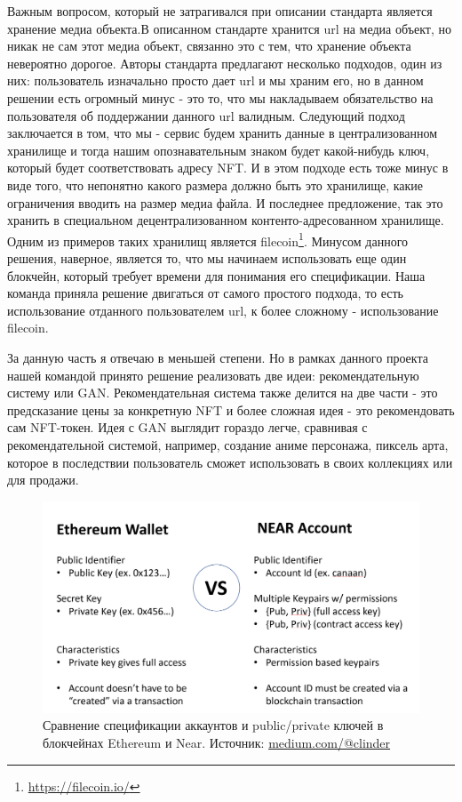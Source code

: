 		Важным вопросом, который не затрагивался при описании стандарта является хранение медиа объекта.В описанном стандарте хранится url на медиа объект, но никак не сам этот медиа объект, связанно это с тем, что хранение объекта невероятно дорогое. Авторы стандарта предлагают несколько подходов, один из них: пользователь изначально просто дает url и мы храним его, но в данном решении есть огромный минус - это то, что мы накладываем обязательство на пользователя об поддержании данного url валидным. Следующий подход заключается в том, что мы - сервис будем хранить данные в централизованном хранилище и тогда нашим опознавательным знаком будет какой-нибудь ключ, который будет соответствовать адресу NFT. И в этом подходе есть тоже минус в виде того, что непонятно какого размера должно быть это хранилище, какие ограничения вводить на размер медиа файла. И последнее предложение, так это хранить в специальном децентрализованном контенто-адресованном хранилище. Одним из примеров таких хранилищ является filecoin\footnote{\url{https://filecoin.io/}}. Минусом данного решения, наверное, является то, что мы начинаем использовать еще один блокчейн, который требует времени для понимания его спецификации. Наша команда приняла решение двигаться от самого простого подхода, то есть использование отданного пользователем url, к более сложному - использование filecoin.

		За данную часть я отвечаю в меньшей степени. Но в рамках данного проекта нашей командой принято решение реализовать две идеи: рекомендательную систему или GAN. Рекомендательная система также делится на две части - это предсказание цены за конкретную NFT и более сложная идея - это рекомендовать сам NFT-токен. Идея с GAN выглядит гораздо легче, сравнивая с рекомендательной системой, например, создание аниме персонажа, пиксель арта, которое в последствии пользователь сможет использовать в своих коллекциях или для продажи.

	\begin{figure}[h!]
		\centering
		\includegraphics[scale=0.15]{fig/eth_near_cmp.png}
	\caption{Сравнение спецификации аккаунтов и public/private ключей в блокчейнах Ethereum и Near. Источник: \url{medium.com/@clinder}}
		\label{fig:eth_near_cmp}
	\end{figure}